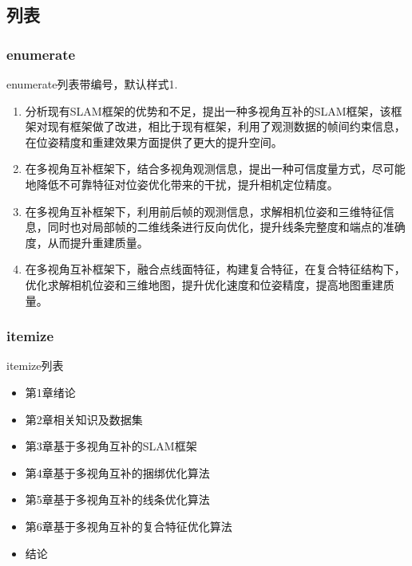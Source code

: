 \subsection{列表}

\subsubsection{enumerate}
enumerate列表带编号，默认样式1.

\begin{enumerate}[(1)]
	\item 分析现有SLAM框架的优势和不足，提出一种多视角互补的SLAM框架，该框架对现有框架做了改进，相比于现有框架，利用了观测数据的帧间约束信息，在位姿精度和重建效果方面提供了更大的提升空间。
	\item 在多视角互补框架下，结合多视角观测信息，提出一种可信度量方式，尽可能地降低不可靠特征对位姿优化带来的干扰，提升相机定位精度。
	\item 在多视角互补框架下，利用前后帧的观测信息，求解相机位姿和三维特征信息，同时也对局部帧的二维线条进行反向优化，提升线条完整度和端点的准确度，从而提升重建质量。
	\item 在多视角互补框架下，融合点线面特征，构建复合特征，在复合特征结构下，优化求解相机位姿和三维地图，提升优化速度和位姿精度，提高地图重建质量。 
\end{enumerate}

\subsubsection{itemize}
itemize列表

\begin{itemize}
\item 第1章\quad 绪论

\item 第2章\quad 相关知识及数据集

\item 第3章\quad 基于多视角互补的SLAM框架

\item 第4章\quad 基于多视角互补的捆绑优化算法

\item 第5章\quad 基于多视角互补的线条优化算法

\item 第6章\quad 基于多视角互补的复合特征优化算法

\item 结论

\end{itemize}

\bjutclearpage
